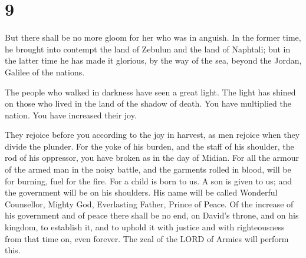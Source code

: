 \hypertarget{section-8}{%
\section{9}\label{section-8}}

 But there shall be no more gloom for her who was in
anguish. In the former time, he brought into contempt the land of
Zebulun and the land of Naphtali; but in the latter time he has made it
glorious, by the way of the sea, beyond the Jordan, Galilee of the
nations.

 The people who walked in darkness have seen a great
light. The light has shined on those who lived in the land of the shadow
of death.  You have multiplied the nation. You have
increased their joy.

They rejoice before you according to the joy in harvest, as men rejoice
when they divide the plunder.  For the yoke of his burden,
and the staff of his shoulder, the rod of his oppressor, you have broken
as in the day of Midian.  For all the armour of the armed
man in the noisy battle, and the garments rolled in blood, will be for
burning, fuel for the fire.  For a child is born to us. A
son is given to us; and the government will be on his shoulders. His
name will be called Wonderful Counsellor, Mighty God, Everlasting
Father, Prince of Peace.  Of the increase of his
government and of peace there shall be no end, on David's throne, and on
his kingdom, to establish it, and to uphold it with justice and with
righteousness from that time on, even forever. The zeal of the LORD of
Armies will perform this.

